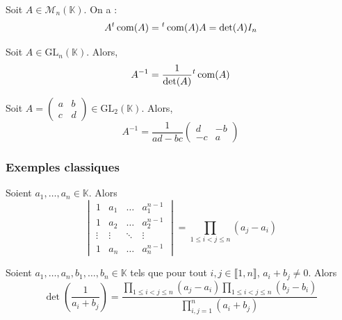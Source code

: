   \begin{proposition}
    Soit $A \in \mathcal{M}_n(\mathbb{K})$. On a :
    \[ A \mathstrut ^t \operatorname{com}(A) = \mathstrut ^t \operatorname{com}(A) A = \det(A) I_n \]
  \end{proposition}

  \begin{corollary}
    Soit $A \in \mathrm{GL}_n(\mathbb{K})$. Alors,
    \[ A^{-1} = \frac{1}{\det(A)} \mathstrut ^t \operatorname{com}(A) \]
  \end{corollary}

  \begin{example}
    Soit $A = \begin{pmatrix} a & b \\ c & d \end{pmatrix} \in \mathrm{GL}_2(\mathbb{K})$. Alors,
    \[ A^{-1} = \frac{1}{ad-bc} \begin{pmatrix} d & -b \\ -c & a \end{pmatrix} \]
  \end{example}

  \subsubsection{Exemples classiques}

  \begin{example}
    Soient $a_1, \dots, a_n \in \mathbb{K}$. Alors
    \[ \begin{vmatrix} 1 & a_1 & \dots & a_1^{n-1} \\ 1 & a_2 & \dots & a_2^{n-1} \\ \vdots & \vdots & \ddots & \vdots \\ 1 & a_n & \dots & a_n^{n-1} \end{vmatrix} = \prod_{1 \leq i < j \leq n} (a_j - a_i) \]
  \end{example}


  \begin{example}
    Soient $a_1, \dots, a_n, b_1, \dots, b_n \in \mathbb{K}$ tels que pour tout $i, j \in \llbracket 1, n \rrbracket$, $a_i + b_j \neq 0$. Alors
    \[ \det \left( \frac{1}{a_i + b_j} \right) = \frac{\prod_{1 \leq i < j \leq n} (a_j - a_i) \prod_{1 \leq i < j \leq n} (b_j - b_i)}{\prod_{i,j = 1}^n (a_i + b_j)} \]
  \end{example}


